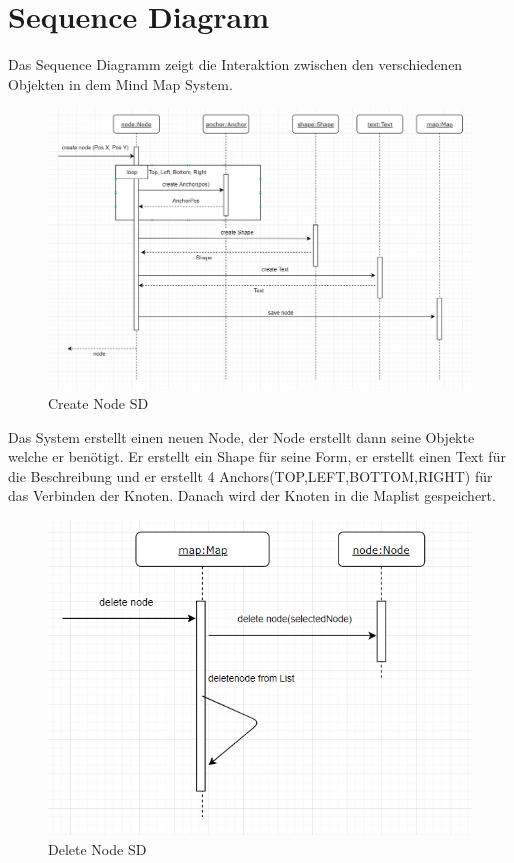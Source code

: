 \section{Sequence Diagram}
\label{sec:sequence_diagram}
Das Sequence Diagramm zeigt die Interaktion zwischen den verschiedenen Objekten in dem Mind Map System.
\begin{figure}[H]
	\centering
		\includegraphics[scale=0.6]{images/crNodeSD.PNG}
	\caption{Create Node SD}
	\label{fig:create_node_SD}
\end{figure}

Das System erstellt einen neuen Node, der Node erstellt dann seine Objekte welche er benötigt.
Er erstellt ein Shape für seine Form, er erstellt einen Text für die Beschreibung und er erstellt
4 Anchors(TOP,LEFT,BOTTOM,RIGHT) für das Verbinden der Knoten. Danach wird der Knoten in die Maplist 
gespeichert.

\begin{figure}[H]
	\centering
		\includegraphics[scale=0.6]{images/delNodeSD.PNG}
	\caption{Delete Node SD}
	\label{fig:delete_node_SD}
\end{figure}

